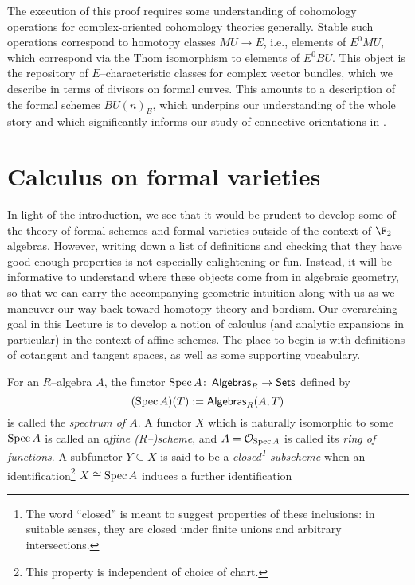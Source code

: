 The execution of this proof requires some understanding of cohomology operations for complex-oriented cohomology theories generally.  Stable such operations correspond to homotopy classes $MU \to E$, i.e., elements of $E^0 MU$, which correspond via the Thom isomorphism to elements of $E^0 BU$.  This object is the repository of $E$--characteristic classes for complex vector bundles, which we describe in terms of divisors on formal curves.  This amounts to a description of the formal schemes $BU(n)_E$, which underpins our understanding of the whole story and which significantly informs our study of connective orientations in .









\section{Calculus on formal varieties}\label{FormalVarietiesLecture}

In light of the introduction, we see that it would be prudent to develop some of the theory of formal schemes and formal varieties outside of the context of $\F_2$--algebras.  However, writing down a list of definitions and checking that they have good enough properties is not especially enlightening or fun.  Instead, it will be informative to understand where these objects come from in algebraic geometry, so that we can carry the accompanying geometric intuition along with us as we maneuver our way back toward homotopy theory and bordism.  Our overarching goal in this Lecture is to develop a notion of calculus (and analytic expansions in particular) in the context of affine schemes.  The place to begin is with definitions of cotangent and tangent spaces, as well as some supporting vocabulary.
\begin{definition}
For an $R$--algebra $A$, the functor $\operatorname{Spec} A \colon\thinspace \mathsf{Algebras}_R \to \mathsf{Sets}$ defined by \[(\operatorname{Spec} A)(T) := \mathsf{Algebras}_R(A, T)\] is called the \textit{spectrum of $A$}.  A functor $X$ which is naturally isomorphic to some $\operatorname{Spec} A$ is called an \textit{affine ($R$--)scheme}, and $A = \mathcal{O}_{\operatorname{Spec} A}$ is called its \textit{ring of functions}.  A subfunctor $Y \subseteq X$ is said to be a \textit{closed\footnote{The word ``closed'' is meant to suggest properties of these inclusions: in suitable senses, they are closed under finite unions and arbitrary intersections.} subscheme} when an identification\footnote{This property is independent of choice of chart.} $X \cong \operatorname{Spec} A$ induces a further identification
\begin{center}
\end{center}
\end{definition}

